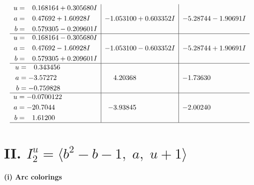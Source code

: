 \documentclass[1p]{elsarticle_modified}
\theoremstyle{definition}
\begin{document}
$$\begin{array}{c|c|c}
\begin{aligned}
u &= \phantom{-}0.168164 + 0.305680 I \\
a &= \phantom{-}0.47692 + 1.60928 I \\
b &= \phantom{-}0.579305 - 0.209601 I\end{aligned}
 & -1.053100 + 0.603352 I & -5.28744 - 1.90691 I \\ \hline\begin{aligned}
u &= \phantom{-}0.168164 - 0.305680 I \\
a &= \phantom{-}0.47692 - 1.60928 I \\
b &= \phantom{-}0.579305 + 0.209601 I\end{aligned}
 & -1.053100 - 0.603352 I & -5.28744 + 1.90691 I \\ \hline\begin{aligned}
u &= \phantom{-}0.343456\phantom{ +0.000000I} \\
a &= -3.57272\phantom{ +0.000000I} \\
b &= -0.759828\phantom{ +0.000000I}\end{aligned}
 & \phantom{-}4.20368\phantom{ +0.000000I} & -1.73630\phantom{ +0.000000I} \\ \hline\begin{aligned}
u &= -0.0700122\phantom{ +0.000000I} \\
a &= -20.7044\phantom{ +0.000000I} \\
b &= \phantom{-}1.61200\phantom{ +0.000000I}\end{aligned}
 & -3.93845\phantom{ +0.000000I} & -2.00240\phantom{ +0.000000I}\\
 \hline 
 \end{array}$$\newpage\newpage\renewcommand{\arraystretch}{1}
\centering \section*{II. $I^u_{2}= \langle b^2- b-1,\;a,\;u+1 \rangle$}
\flushleft \textbf{(i) Arc colorings}\\
\end{document}
